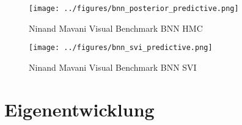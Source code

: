 \begin{otherlanguage}{ngerman}


\begin{figure}[!h]
  \centering
  \begin{minipage}{0.5\textwidth}
      \centering
      \texttt{[image: ../figures/bnn\_posterior\_predictive.png]}
      \caption{Ninand Mavani Visual Benchmark BNN HMC}
  \end{minipage}%
  \begin{minipage}{0.5\textwidth}
      \centering
      \texttt{[image: ../figures/bnn\_svi\_predictive.png]}
      \caption{Ninand Mavani Visual Benchmark BNN SVI}
  \end{minipage}
\end{figure}


\section*{Eigenentwicklung}


\end{otherlanguage}

